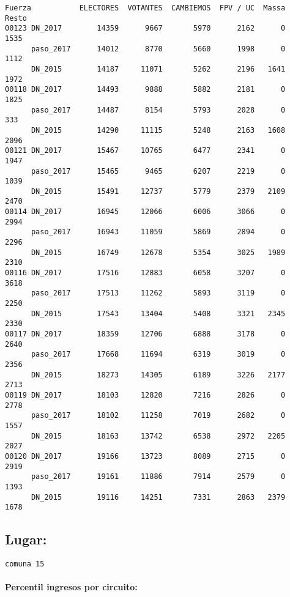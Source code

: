 \documentclass[11pt]{article}
\begin{document}
    \begin{verbatim}
Fuerza           ELECTORES  VOTANTES  CAMBIEMOS  FPV / UC  Massa  Resto
00123 DN_2017        14359      9667       5970      2162      0   1535
      paso_2017      14012      8770       5660      1998      0   1112
      DN_2015        14187     11071       5262      2196   1641   1972
00118 DN_2017        14493      9888       5882      2181      0   1825
      paso_2017      14487      8154       5793      2028      0    333
      DN_2015        14290     11115       5248      2163   1608   2096
00121 DN_2017        15467     10765       6477      2341      0   1947
      paso_2017      15465      9465       6207      2219      0   1039
      DN_2015        15491     12737       5779      2379   2109   2470
00114 DN_2017        16945     12066       6006      3066      0   2994
      paso_2017      16943     11059       5869      2894      0   2296
      DN_2015        16749     12678       5354      3025   1989   2310
00116 DN_2017        17516     12883       6058      3207      0   3618
      paso_2017      17513     11262       5893      3119      0   2250
      DN_2015        17543     13404       5408      3321   2345   2330
00117 DN_2017        18359     12706       6888      3178      0   2640
      paso_2017      17668     11694       6319      3019      0   2356
      DN_2015        18273     14305       6189      3226   2177   2713
00119 DN_2017        18103     12820       7216      2826      0   2778
      paso_2017      18102     11258       7019      2682      0   1557
      DN_2015        18163     13742       6538      2972   2205   2027
00120 DN_2017        19166     13723       8089      2715      0   2919
      paso_2017      19161     11886       7914      2579      0   1393
      DN_2015        19116     14251       7331      2863   2379   1678
    \end{verbatim}

    
    \hypertarget{lugar}{%
\subsection{Lugar:}\label{lugar}}

    
    \begin{Verbatim}[commandchars=\\\{\}]
comuna 15

    \end{Verbatim}

    \hypertarget{percentil-ingresos-por-circuito}{%
\paragraph{Percentil ingresos por
circuito:}\label{percentil-ingresos-por-circuito}}
\end{document}
